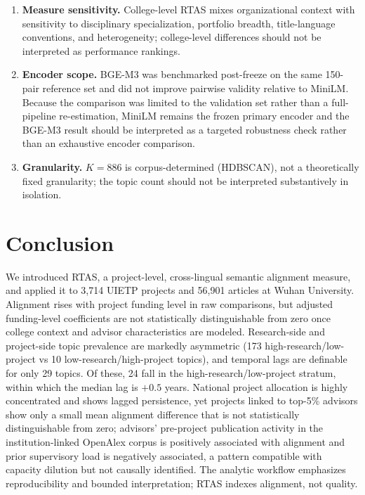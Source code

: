 \documentclass[11pt]{article}
\begin{document}
\begin{enumerate}
\item \textbf{Measure sensitivity.} College-level RTAS mixes organizational context with sensitivity to disciplinary specialization, portfolio breadth, title-language conventions, and heterogeneity; college-level differences should not be interpreted as performance rankings.

\item \textbf{Encoder scope.} BGE-M3 was benchmarked post-freeze on the same 150-pair reference set and did not improve pairwise validity relative to MiniLM. Because the comparison was limited to the validation set rather than a full-pipeline re-estimation, MiniLM remains the frozen primary encoder and the BGE-M3 result should be interpreted as a targeted robustness check rather than an exhaustive encoder comparison.

\item \textbf{Granularity.} $K=886$ is corpus-determined (HDBSCAN), not a theoretically fixed granularity; the topic count should not be interpreted substantively in isolation.
\end{enumerate}

\section{Conclusion}

We introduced RTAS, a project-level, cross-lingual semantic alignment measure, and applied it to 3,714 UIETP projects and 56,901 articles at Wuhan University. Alignment rises with project funding level in raw comparisons, but adjusted funding-level coefficients are not statistically distinguishable from zero once college context and advisor characteristics are modeled. Research-side and project-side topic prevalence are markedly asymmetric (173 high-research/low-project vs 10 low-research/high-project topics), and temporal lags are definable for only 29 topics. Of these, 24 fall in the high-research/low-project stratum, within which the median lag is $+0.5$ years. National project allocation is highly concentrated and shows lagged persistence, yet projects linked to top-5\% advisors show only a small mean alignment difference that is not statistically distinguishable from zero; advisors' pre-project publication activity in the institution-linked OpenAlex corpus is positively associated with alignment and prior supervisory load is negatively associated, a pattern compatible with capacity dilution but not causally identified. The analytic workflow emphasizes reproducibility and bounded interpretation; RTAS indexes alignment, not quality.
\end{document}
